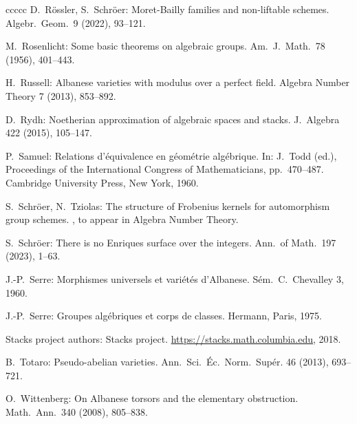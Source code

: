 \documentclass[oneside, 12pt]{amsart}
\theoremstyle{definition}
\theoremstyle{remark}
\begin{document}
\begin{thebibliography}{ccccc}
D.\ R\"ossler, S.\ Schr\"oer:
Moret-Bailly families and non-liftable schemes.
Algebr.\ Geom.\ 9 (2022),  93--121. 

M.\ Rosenlicht:
Some basic theorems on algebraic groups.
Am.\ J.\  Math.\ 78 (1956),  401--443.

H.\ Russell: 
Albanese varieties with modulus over a perfect field. 
Algebra Number Theory 7 (2013),   853--892. 

D.\ Rydh:
Noetherian approximation of algebraic spaces and stacks.
J.\ Algebra 422 (2015), 105--147.

P.\ Samuel:
Relations d'équivalence en géométrie algébrique. 
In:
J.\ Todd (ed.), Proceedings of the International Congress of Mathematicians, pp.\ 470--487.
Cambridge University Press, New York, 1960.
 
S.\ Schr\"oer, N.\ Tziolas:
The structure of Frobenius kernels for automorphism group schemes.
, to appear in Algebra Number Theory.
 
S.\ Schr\"oer:
There is no Enriques surface over the integers.
Ann.\ of Math.\ 197 (2023), 1--63.

J.-P.\ Serre:
Morphismes universels et vari\'et\'es d'Albanese. 
S\'em.\ C.\ Chevalley 3, 1960. 

J.-P.\ Serre:
Groupes alg\'ebriques et corps de classes.
Hermann, Paris, 1975.

Stacks project authors: Stacks project.
\url{https://stacks.math.columbia.edu}, 2018.

B.\ Totaro:
Pseudo-abelian varieties. 
Ann.\ Sci.\ \'Ec.\ Norm.\ Sup\'er.   46 (2013),   693--721. 

O.\ Wittenberg:
On Albanese torsors and the elementary obstruction. 
Math.\ Ann.\ 340 (2008), 805--838. 

\end{thebibliography}
\end{document}
